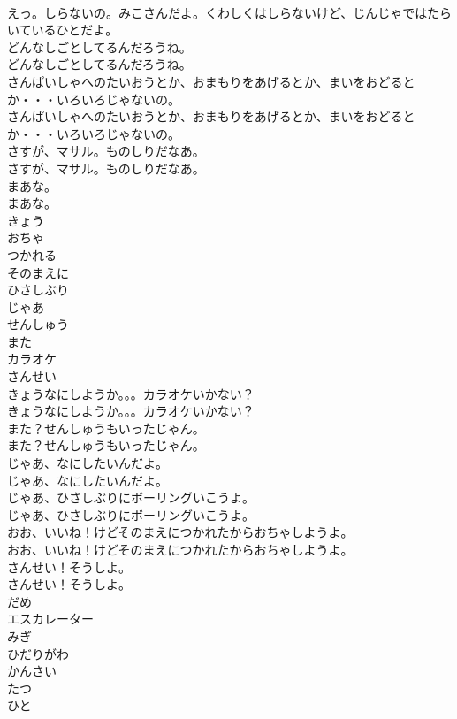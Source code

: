 \documentclass[8pt]{extreport}
\begin{document}
\begin{CJK}{UTF8}{min}
\\	えっ。しらないの。みこさんだよ。くわしくはしらないけど、じんじゃではたらいているひとだよ。
\\	どんなしごとしてるんだろうね。
\\	どんなしごとしてるんだろうね。
\\	さんぱいしゃへのたいおうとか、おまもりをあげるとか、まいをおどるとか・・・いろいろじゃないの。
\\	さんぱいしゃへのたいおうとか、おまもりをあげるとか、まいをおどるとか・・・いろいろじゃないの。
\\	さすが、マサル。ものしりだなあ。
\\	さすが、マサル。ものしりだなあ。
\\	まあな。
\\	まあな。
\\	きょう
\\	おちゃ
\\	つかれる
\\	そのまえに
\\	ひさしぶり
\\	じゃあ
\\	せんしゅう
\\	また
\\	カラオケ
\\	さんせい
\\	きょうなにしようか。。。カラオケいかない？
\\	きょうなにしようか。。。カラオケいかない？
\\	また？せんしゅうもいったじゃん。
\\	また？せんしゅうもいったじゃん。
\\	じゃあ、なにしたいんだよ。
\\	じゃあ、なにしたいんだよ。
\\	じゃあ、ひさしぶりにボーリングいこうよ。
\\	じゃあ、ひさしぶりにボーリングいこうよ。
\\	おお、いいね！けどそのまえにつかれたからおちゃしようよ。
\\	おお、いいね！けどそのまえにつかれたからおちゃしようよ。
\\	さんせい！そうしよ。
\\	さんせい！そうしよ。
\\	だめ
\\	エスカレーター
\\	みぎ
\\	ひだりがわ
\\	かんさい
\\	たつ
\\	ひと

\end{CJK}
\end{document}
